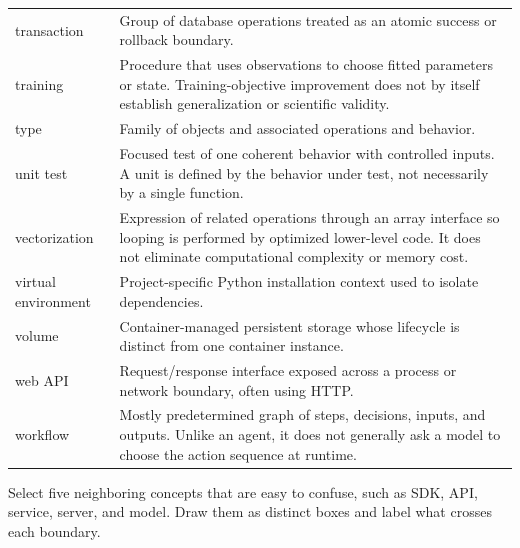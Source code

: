 \begin{longtable}{@{}p{}p{}@{}}
transaction & Group of database operations treated as an atomic success or
rollback boundary. \\
training & Procedure that uses observations to choose fitted parameters or
state. Training-objective improvement does not by itself establish
generalization or scientific validity. \\
type & Family of objects and associated operations and behavior. \\
unit test & Focused test of one coherent behavior with controlled inputs. A unit
is defined by the behavior under test, not necessarily by a single function. \\
vectorization & Expression of related operations through an array interface so
looping is performed by optimized lower-level code. It does not eliminate
computational complexity or memory cost. \\
virtual environment & Project-specific Python installation context used to
isolate dependencies. \\
volume & Container-managed persistent storage whose lifecycle is distinct from
one container instance. \\
web API & Request/response interface exposed across a process or network
boundary, often using HTTP. \\
workflow & Mostly predetermined graph of steps, decisions, inputs, and outputs.
Unlike an agent, it does not generally ask a model to choose the action sequence
at runtime. \\
\bottomrule
\end{longtable}

\begin{checkpointbox}
Select five neighboring concepts that are easy to confuse, such as SDK, API,
service, server, and model. Draw them as distinct boxes and label what crosses
each boundary.
\end{checkpointbox}
